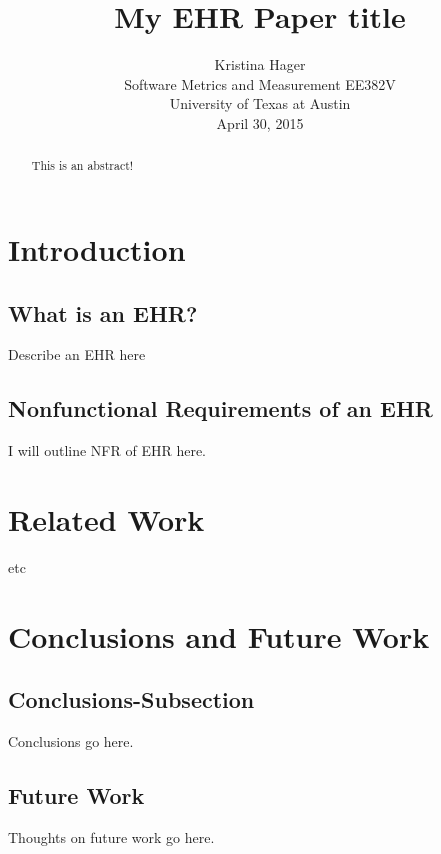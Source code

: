 \documentclass[10pt]{article}
\begin{document}
\title{My EHR Paper title}

\author{Kristina Hager\\
Software Metrics and Measurement EE382V\\
University of Texas at Austin\\
April 30, 2015\\
}

\maketitle
\thispagestyle{empty}

\begin{abstract}
	This is an abstract!
\end{abstract}


\section{Introduction}

\subsection{What is an EHR?}
\label{sec:What is an EHR}
Describe an EHR here \cite{auditingprivacy}


\subsection{Nonfunctional Requirements of an EHR}
\label{sec:Nonfunctional Requirements of an EHR}
I will outline NFR of EHR here.

\section{Related Work}
\label{sec:Related}
etc

\section{Conclusions and Future Work}

\subsection{Conclusions-Subsection}
\label{sec:Conclusions-Subsection}

Conclusions go here. 

\subsection{Future Work}
\label{sec:Future Work}
Thoughts on future work go here.



\end{document}
